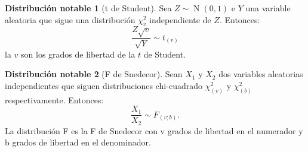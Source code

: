 \documentclass{article}
\theoremstyle{definition}
\newtheorem{distr}{Distribución notable}
\theoremstyle{remark}
\DeclareMathOperator{\normal}{N}
\begin{document}
\begin{distr}[t de Student]
	Sea $Z \sim \normal(0, 1)$ e $Y$ una variable aleatoria que sigue una distribución $\chi_{v}^2$ independiente de $Z$. Entonces:
	\begin{equation*}
		\frac{Z\sqrt{v}}{\sqrt{Y}} \sim t_{(v)}
	\end{equation*}
	la $v$ son los grados de libertad de la $t$ de Student.
\end{distr}

\begin{distr}[F de Snedecor]
	Sean $X_1$ y $X_2$ dos variables aleatorias independientes que siguen distribuciones chi-cuadrado $\chi_{(v)}^2$ y $\chi_{(b)}^2$ respectivamente. Entonces:
	\begin{equation*}
		\frac{X_1}{X_2} \sim F_{(v;b)}.
	\end{equation*}
	La distribución F es la F de Snedecor con v grados de libertad en el numerador y b grados de libertad en el denominador. 
\end{distr}
\end{document}
